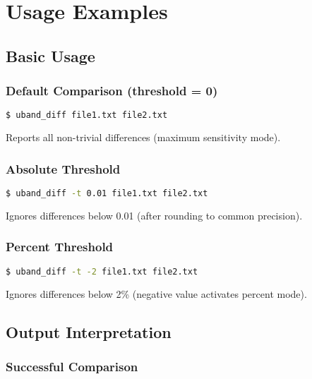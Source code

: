 \section{Usage Examples}
\label{sec:examples}

\subsection{Basic Usage}

\subsubsection{Default Comparison (threshold = 0)}

\begin{lstlisting}[language=bash]
$ uband_diff file1.txt file2.txt
\end{lstlisting}

Reports all non-trivial differences (maximum sensitivity mode).

\subsubsection{Absolute Threshold}

\begin{lstlisting}[language=bash]
$ uband_diff -t 0.01 file1.txt file2.txt
\end{lstlisting}

Ignores differences below 0.01 (after rounding to common precision).

\subsubsection{Percent Threshold}

\begin{lstlisting}[language=bash]
$ uband_diff -t -2 file1.txt file2.txt
\end{lstlisting}

Ignores differences below 2\% (negative value activates percent mode).

\subsection{Output Interpretation}

\subsubsection{Successful Comparison}

